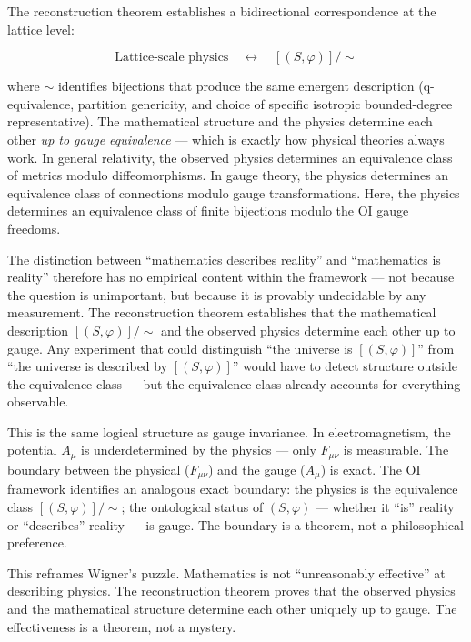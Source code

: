 \documentclass[
  11pt,
]{article}
\begin{document}
The reconstruction theorem establishes a bidirectional correspondence at
the lattice level:

\[\text{Lattice-scale physics} \quad \longleftrightarrow \quad [(S, \varphi)] / \sim\]

where \(\sim\) identifies bijections that produce the same emergent
description (q-equivalence, partition genericity, and choice of specific
isotropic bounded-degree representative). The mathematical structure and
the physics determine each other \emph{up to gauge equivalence} ---
which is exactly how physical theories always work. In general
relativity, the observed physics determines an equivalence class of
metrics modulo diffeomorphisms. In gauge theory, the physics determines
an equivalence class of connections modulo gauge transformations. Here,
the physics determines an equivalence class of finite bijections modulo
the OI gauge freedoms.

The distinction between ``mathematics describes reality'' and
``mathematics is reality'' therefore has no empirical content within the
framework --- not because the question is unimportant, but because it is
provably undecidable by any measurement. The reconstruction theorem
establishes that the mathematical description \([(S, \varphi)]/\sim\)
and the observed physics determine each other up to gauge. Any
experiment that could distinguish ``the universe is \([(S, \varphi)]\)''
from ``the universe is described by \([(S, \varphi)]\)'' would have to
detect structure outside the equivalence class --- but the equivalence
class already accounts for everything observable.

This is the same logical structure as gauge invariance. In
electromagnetism, the potential \(A_\mu\) is underdetermined by the
physics --- only \(F_{\mu\nu}\) is measurable. The boundary between the
physical (\(F_{\mu\nu}\)) and the gauge (\(A_\mu\)) is exact. The OI
framework identifies an analogous exact boundary: the physics is the
equivalence class \([(S, \varphi)]/\sim\); the ontological status of
\((S, \varphi)\) --- whether it ``is'' reality or ``describes'' reality
--- is gauge. The boundary is a theorem, not a philosophical preference.

This reframes Wigner's puzzle. Mathematics is not ``unreasonably
effective'' at describing physics. The reconstruction theorem proves
that the observed physics and the mathematical structure determine each
other uniquely up to gauge. The effectiveness is a theorem, not a
mystery.
\end{document}
